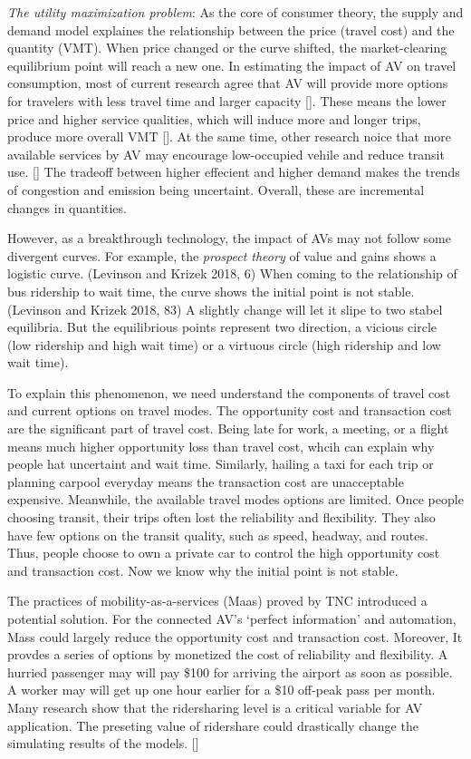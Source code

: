 \documentclass[12pt,]{article}
\begin{document}
\emph{The utility maximization problem}: As the core of consumer theory,
the supply and demand model explaines the relationship between the price
(travel cost) and the quantity (VMT). When price changed or the curve
shifted, the market-clearing equilibrium point will reach a new one. In
estimating the impact of AV on travel consumption, most of current
research agree that AV will provide more options for travelers with less
travel time and larger capacity {[}{]}. These means the lower price and
higher service qualities, which will induce more and longer trips,
produce more overall VMT {[}{]}. At the same time, other research noice
that more available services by AV may encourage low-occupied vehile and
reduce transit use. {[}{]} The tradeoff between higher effecient and
higher demand makes the trends of congestion and emission being
uncertaint. Overall, these are incremental changes in quantities.

However, as a breakthrough technology, the impact of AVs may not follow
some divergent curves. For example, the \emph{prospect theory} of value
and gains shows a logistic curve. (Levinson and Krizek 2018, 6) When
coming to the relationship of bus ridership to wait time, the curve
shows the initial point is not stable. (Levinson and Krizek 2018, 83) A
slightly change will let it slipe to two stabel equilibria. But the
equilibrious points represent two direction, a vicious circle (low
ridership and high wait time) or a virtuous circle (high ridership and
low wait time).

To explain this phenomenon, we need understand the components of travel
cost and current options on travel modes. The opportunity cost and
transaction cost are the significant part of travel cost. Being late for
work, a meeting, or a flight means much higher opportunity loss than
travel cost, whcih can explain why people hat uncertaint and wait time.
Similarly, hailing a taxi for each trip or planning carpool everyday
means the transaction cost are unacceptable expensive. Meanwhile, the
available travel modes options are limited. Once people choosing
transit, their trips often lost the reliability and flexibility. They
also have few options on the transit quality, such as speed, headway,
and routes. Thus, people choose to own a private car to control the high
opportunity cost and transaction cost. Now we know why the initial point
is not stable.

The practices of mobility-as-a-services (Maas) proved by TNC introduced
a potential solution. For the connected AV's `perfect information' and
automation, Mass could largely reduce the opportunity cost and
transaction cost. Moreover, It provdes a series of options by monetized
the cost of reliability and flexibility. A hurried passenger may will
pay \$100 for arriving the airport as soon as possible. A worker may
will get up one hour earlier for a \$10 off-peak pass per month. Many
research show that the ridersharing level is a critical variable for AV
application. The preseting value of ridershare could drastically change
the simulating results of the models. {[}{]}
\end{document}
